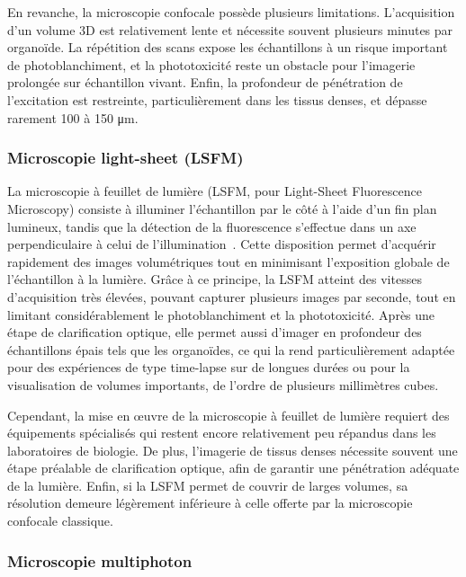 En revanche, la microscopie confocale possède plusieurs limitations. L’acquisition d’un volume 3D est relativement lente et nécessite souvent plusieurs minutes par organoïde. La répétition des scans expose les échantillons à un risque important de photoblanchiment, et la phototoxicité reste un obstacle pour l’imagerie prolongée sur échantillon vivant. Enfin, la profondeur de pénétration de l’excitation est restreinte, particulièrement dans les tissus denses, et dépasse rarement 100 à 150 μm.

\subsubsection{Microscopie light-sheet (LSFM)}

La microscopie à feuillet de lumière (LSFM, pour Light-Sheet Fluorescence Microscopy) consiste à illuminer l’échantillon par le côté à l’aide d’un fin plan lumineux, tandis que la détection de la fluorescence s’effectue dans un axe perpendiculaire à celui de l’illumination~\cite{Huisken2004}. Cette disposition permet d’acquérir rapidement des images volumétriques tout en minimisant l’exposition globale de l’échantillon à la lumière. Grâce à ce principe, la LSFM atteint des vitesses d’acquisition très élevées, pouvant capturer plusieurs images par seconde, tout en limitant considérablement le photoblanchiment et la phototoxicité. Après une étape de clarification optique, elle permet aussi d’imager en profondeur des échantillons épais tels que les organoïdes, ce qui la rend particulièrement adaptée pour des expériences de type time-lapse sur de longues durées ou pour la visualisation de volumes importants, de l’ordre de plusieurs millimètres cubes.

Cependant, la mise en œuvre de la microscopie à feuillet de lumière requiert des équipements spécialisés qui restent encore relativement peu répandus dans les laboratoires de biologie. De plus, l’imagerie de tissus denses nécessite souvent une étape préalable de clarification optique, afin de garantir une pénétration adéquate de la lumière. Enfin, si la LSFM permet de couvrir de larges volumes, sa résolution demeure légèrement inférieure à celle offerte par la microscopie confocale classique.

\subsubsection{Microscopie multiphoton}

